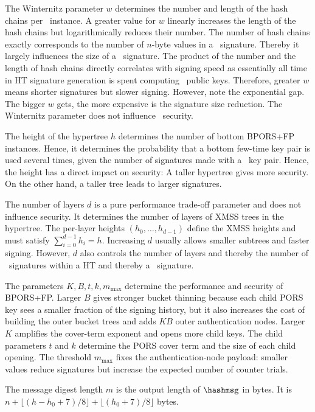 The Winternitz parameter $w$ determines the number and length of the hash chains per \WOTSCS\ instance. A greater value for $w$ linearly increases the length of the hash chains but logarithmically reduces their number. The number of hash chains exactly corresponds to the number of $n$-byte values in a \WOTSCS\ signature. Thereby it largely influences the size of a \SPHINCSA\ signature. The product of the number and the length of hash chains directly correlates with signing speed as essentially all time in HT signature generation is spent computing \WOTSCS\ public keys. Therefore, greater $w$ means shorter signatures but slower signing. However, note the exponential gap. The bigger $w$ gets, the more expensive is the signature size reduction. The Winternitz parameter does not influence \SPHINCSA\ security.

The height of the hypertree $h$ determines the number of bottom BPORS+FP
instances. Hence, it determines the probability that a bottom few-time key pair
is used several times, given the number of signatures made with a \SPHINCSA\
key pair. Hence, the height has a direct impact on security: A taller hypertree
gives more security. On the other hand, a taller tree leads to larger
signatures.

The number of layers $d$ is a pure performance trade-off parameter and does not influence security. It determines the number of layers of XMSS trees in the hypertree. The per-layer heights $(h_0,\ldots,h_{d-1})$ define the XMSS heights and must satisfy $\sum_{i=0}^{d-1} h_i = h$. Increasing $d$ usually allows smaller subtrees and faster signing. However, $d$ also controls the number of layers and thereby the number of \WOTSCS\ signatures within a HT and thereby a \SPHINCSA\ signature.

The parameters $K,B,t,k,m_{\max}$ determine the performance and security of
BPORS+FP.  Larger $B$ gives stronger bucket thinning because each child PORS key
sees a smaller fraction of the signing history, but it also increases the cost
of building the outer bucket trees and adds $KB$ outer authentication nodes.
Larger $K$ amplifies the cover-term exponent and opens more child keys.  The
child parameters $t$ and $k$ determine the PORS cover term and the size of each
child opening.  The threshold $m_{\max}$ fixes the authentication-node payload:
smaller values reduce signatures but increase the expected number of counter
trials.

The message digest length $m$ is the output length of $\hashmsg$ in bytes. It
is $n+\lfloor(h-h_0+7)/8\rfloor+\lfloor(h_0+7)/8\rfloor$ bytes.

